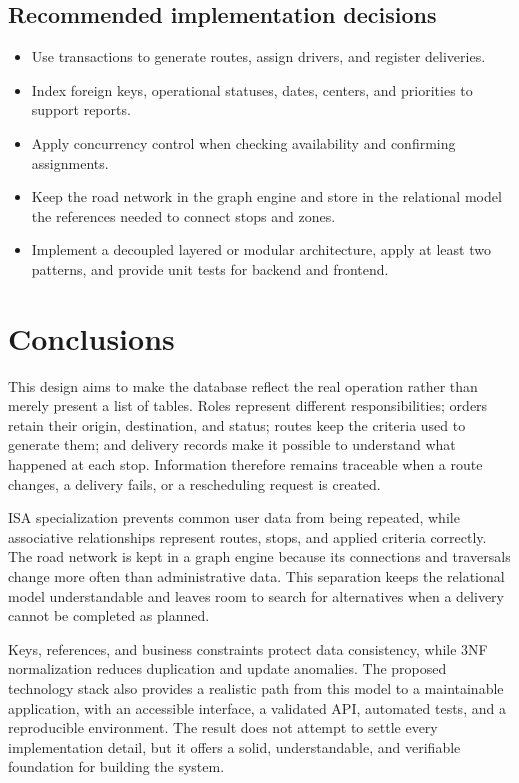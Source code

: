 \documentclass[12pt,a4paper]{article}
\begin{document}
\subsection{Recommended implementation decisions}
\begin{itemize}
\item Use transactions to generate routes, assign drivers, and register deliveries.
\item Index foreign keys, operational statuses, dates, centers, and priorities to support reports.
\item Apply concurrency control when checking availability and confirming assignments.
\item Keep the road network in the graph engine and store in the relational model the references needed to connect stops and zones.
\item Implement a decoupled layered or modular architecture, apply at least two patterns, and provide unit tests for backend and frontend.
\end{itemize}

\section{Conclusions}
This design aims to make the database reflect the real operation rather than merely present a list of tables. Roles represent different responsibilities; orders retain their origin, destination, and status; routes keep the criteria used to generate them; and delivery records make it possible to understand what happened at each stop. Information therefore remains traceable when a route changes, a delivery fails, or a rescheduling request is created.

ISA specialization prevents common user data from being repeated, while associative relationships represent routes, stops, and applied criteria correctly. The road network is kept in a graph engine because its connections and traversals change more often than administrative data. This separation keeps the relational model understandable and leaves room to search for alternatives when a delivery cannot be completed as planned.

Keys, references, and business constraints protect data consistency, while 3NF normalization reduces duplication and update anomalies. The proposed technology stack also provides a realistic path from this model to a maintainable application, with an accessible interface, a validated API, automated tests, and a reproducible environment. The result does not attempt to settle every implementation detail, but it offers a solid, understandable, and verifiable foundation for building the system.
\end{document}
